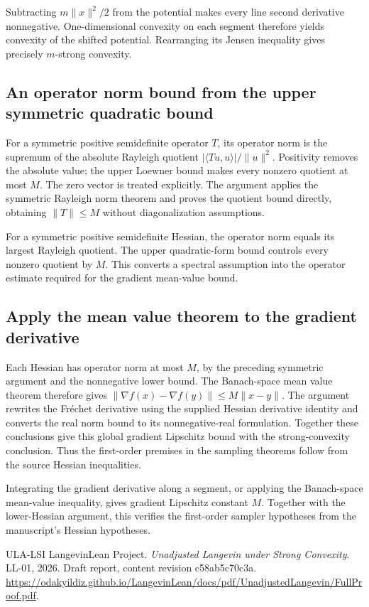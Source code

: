 \documentclass[11pt,a4paper]{report}
\begin{document}
Subtracting \(m\|x\|^2/2\) from the potential makes every line second derivative nonnegative. One-dimensional convexity on each segment therefore yields convexity of the shifted potential. Rearranging its Jensen inequality gives precisely \(m\)-strong convexity.

\subsection{\texorpdfstring{An operator norm bound from the upper symmetric quadratic bound}{An operator norm bound from the upper symmetric quadratic bound}}
\label{report-step-KineticLangevin-HessianAssumptions-lean-3}


For a symmetric positive semidefinite operator \(T\), its operator norm is the supremum of the absolute Rayleigh quotient \(|\langle Tu,u\rangle|/\|u\|^2\). Positivity removes the absolute value; the upper Loewner bound makes every nonzero quotient at most \(M\). The zero vector is treated explicitly. The argument applies the symmetric Rayleigh norm theorem and proves the quotient bound directly, obtaining \(\|T\|\le M\) without diagonalization assumptions.



For a symmetric positive semidefinite Hessian, the operator norm equals its largest Rayleigh quotient. The upper quadratic-form bound controls every nonzero quotient by \(M\). This converts a spectral assumption into the operator estimate required for the gradient mean-value bound.

\subsection{\texorpdfstring{Apply the mean value theorem to the gradient derivative}{Apply the mean value theorem to the gradient derivative}}
\label{report-step-KineticLangevin-HessianAssumptions-lean-4}


Each Hessian has operator norm at most \(M\), by the preceding symmetric argument and the nonnegative lower bound. The Banach-space mean value theorem therefore gives \(\|\nabla f(x)-\nabla f(y)\|\le M\|x-y\|\). The argument rewrites the Fréchet derivative using the supplied Hessian derivative identity and converts the real norm bound to its nonnegative-real formulation. Together these conclusions give this global gradient Lipschitz bound with the strong-convexity conclusion. Thus the first-order premises in the sampling theorems follow from the source Hessian inequalities.



Integrating the gradient derivative along a segment, or applying the Banach-space mean-value inequality, gives gradient Lipschitz constant \(M\). Together with the lower-Hessian argument, this verifies the first-order sampler hypotheses from the manuscript’s Hessian hypotheses.


\begin{thebibliography}{ULA-LSI}
LangevinLean Project. \emph{Unadjusted Langevin under Strong Convexity}. LL-01, 2026. Draft report, content revision c58ab5c70c3a. \url{https://odakyildiz.github.io/LangevinLean/docs/pdf/UnadjustedLangevin/FullProof.pdf}.
\end{thebibliography}
\end{document}
